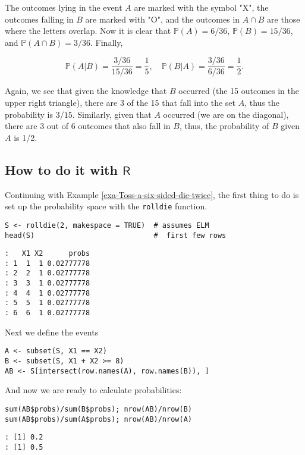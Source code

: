 The outcomes lying in the event \(A\) are marked with the symbol
"X", the outcomes falling in \(B\) are marked with "O", and the
outcomes in \(A\cap B\) are those where the letters overlap. Now it is
clear that \(\mathbb{P}(A)=6/36\), \(\mathbb{P}(B)=15/36\), and
\(\mathbb{P}(A\cap B)=3/36\).  Finally, 

\[
\mathbb{P}(A|B)=\frac{3/36}{15/36}=\frac{1}{5},\quad
\mathbb{P}(B|A)=\frac{3/36}{6/36}=\frac{1}{2}.  
\] 

Again, we see that given the knowledge that \(B\) occurred (the 15
outcomes in the upper right triangle), there are 3 of the 15 that fall
into the set \(A\), thus the probability is \(3/15\). Similarly, given
that \(A\) occurred (we are on the diagonal), there are 3 out of 6
outcomes that also fall in \(B\), thus, the probability of \(B\) given
\(A\) is 1/2.

\subsection{How to do it with \(\mathsf{R}\)}
\label{sec-4-6-1}

Continuing with Example \ref{exa-Toss-a-six-sided-die-twice}, the first thing to do is set
up the probability space with the \texttt{rolldie} function.

\begin{Verbatim}
S <- rolldie(2, makespace = TRUE)  # assumes ELM
head(S)                            #  first few rows
\end{Verbatim}

\begin{verbatim}
:   X1 X2      probs
: 1  1  1 0.02777778
: 2  2  1 0.02777778
: 3  3  1 0.02777778
: 4  4  1 0.02777778
: 5  5  1 0.02777778
: 6  6  1 0.02777778
\end{verbatim}

Next we define the events

\begin{Verbatim}
A <- subset(S, X1 == X2)
B <- subset(S, X1 + X2 >= 8)
AB <- S[intersect(row.names(A), row.names(B)), ]
\end{Verbatim}

And now we are ready to calculate probabilities:

\begin{Verbatim}
sum(AB$probs)/sum(B$probs); nrow(AB)/nrow(B)
sum(AB$probs)/sum(A$probs); nrow(AB)/nrow(A)
\end{Verbatim}

\begin{verbatim}
: [1] 0.2
: [1] 0.5
\end{verbatim}

